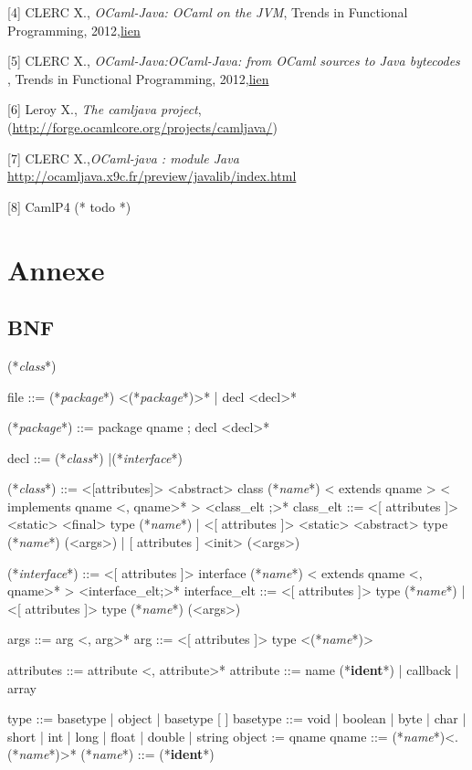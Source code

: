 \documentclass[a4paper, 11pt, notitlepage]{article}
\newcommand{\class}{\ttfamily\textit{class}}
\newcommand{\interface}{\ttfamily\textit{interface}}
\newcommand{\name}{\ttfamily\textit{name}}
\newcommand{\package}{\ttfamily\textit{package}}
\newcommand{\ident}{\footnotesize\textbf{ident}}
\begin{document}
[4] CLERC X., \emph{OCaml-Java: OCaml on the JVM}, Trends in
Functional Programming,
2012,\href{}{lien}

[5] CLERC X., \emph{OCaml-Java:OCaml-Java: from OCaml sources to Java bytecodes }, Trends in Functional Programming, 2012,\href{http://www.lexifi.com/ml2012/full9.pdf}{lien}

[6] Leroy X., \emph{The camljava project},
(\url{http://forge.ocamlcore.org/projects/camljava/})

[7] CLERC X.,\emph{OCaml-java : module Java} \url{http://ocamljava.x9c.fr/preview/javalib/index.html}

[8] CamlP4 (* todo *)












\newpage
\section{Annexe}


\subsection*{BNF}
\begin{idl}
(*\class*)

file ::= (*\package*) <(*\package*)>*
  	| decl <decl>*
 
(*\package*) ::= package qname ; decl <decl>*

decl ::= (*\class*)
  	|(*\interface*)
 
(*\class*) ::= <[attributes]> <abstract> class (*\name*)
  	  < extends qname >
  	  < implements qname <, qname>* >
  	  { <class_elt ;>* }
class_elt ::= <[ attributes ]> <static> <final> type (*\name*)
            | <[ attributes ]> <static> <abstract> type (*\name*) (<args>)
            | [ attributes ] <init> (<args>)
 
(*\interface*) ::= <[ attributes ]> interface (*\name*)
  	       < extends qname <, qname>* >
  	      { <interface_elt;>* }
interface_elt ::= 
     <[ attributes ]> type (*\name*)
   | <[ attributes ]> type (*\name*) (<args>)
 
args ::= arg <, arg>*
arg ::= <[ attributes ]> type <(*\name*)>
 
attributes ::= 	attribute <, attribute>*
attribute ::= name (*\ident*)
  	    | callback
  	    | array
 
type ::= basetype
       | object
       | basetype [ ]
basetype ::= void
           | boolean
           | byte
           | char
           | short
           | int
           | long
           | float
           | double
           | string
object := qname
qname ::= (*\name*)<.(*\name*)>*
(*\name*) ::= (*\ident*)
\end{idl}
\end{document}
